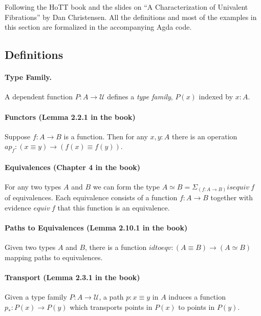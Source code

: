 \documentclass{entcs}
\begin{document}
Following the HoTT book and the slides on ``A Characterization of Univalent
Fibrations'' by Dan Christensen. All the definitions and most of the examples in
this section are formalized in the accompanying Agda code.

\subsection{Definitions}

\paragraph*{Type Family.} A dependent function $P : A \to \mathcal{U}$ defines a
\emph{type family}, $P(x)$ indexed by $x:A$.

\paragraph*{Functors (Lemma 2.2.1 in the book)} Suppose $f : A \to B$ is a
function. Then for any $x,y:A$ there is an operation
$\mathit{ap}_f : (x \equiv y) \to (f(x) \equiv f(y))$.

\paragraph*{Equivalences (Chapter 4 in the book)} For any two types $A$ and $B$
we can form the type $A \simeq B = \Sigma_{(f : A \to B)} \mathit{isequiv}~f$ of
equivalences. Each equivalence consists of a function $f : A \to B$ together
with evidence $\mathit{equiv}~f$ that this function is an equivalence.

\paragraph*{Paths to Equivalences (Lemma 2.10.1 in the book)} Given two types
$A$ and $B$, there is a function
$\mathit{idtoeqv} : (A \equiv B) \to (A \simeq B)$ mapping paths to
equivalences.

\paragraph*{Transport (Lemma 2.3.1 in the book)} Given a type family
$P : A \to \mathcal{U}$, a path $p : x \equiv y$ in $A$ induces a function
$p_* : P(x) \to P(y)$ which transports points in $P(x)$ to points in $P(y)$.
\end{document}
